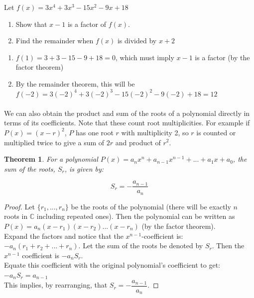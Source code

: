 \documentclass[12pt, a4paper, titlepage, twoside]{article}
\newcommand*{\C}{\mathbb{C}}
\newtheorem*{theorem*}{Theorem}
\newcounter{excount}[subsection]
\begin{document}
	\hfill
	
	\begin{ex}
		Let $f(x) = 3x^4 + 3x^3 - 15x^2 - 9x + 18$
		
		\begin{enumerate}[label=\textbf{(\alph*)}]
			\item Show that $x-1$ is a factor of $f(x)$.
			\item Find the remainder when $f(x)$ is divided by $x+2$
		\end{enumerate}
		
		\hfill
		\tcbline
		\hfill
		
		\begin{enumerate}[label=\textbf{(\alph*)}]
			\item $f(1) = 3 + 3 - 15 - 9 + 18 = 0$, which must imply $x-1$ is a factor (by the factor theorem)
			\item By the remainder theorem, this will be\\ $f(-2) = 3(-2)^4 + 3(-2)^3 - 15(-2)^2 -9(-2) + 18 = 12$
		\end{enumerate}
	\end{ex}
	
	\paragraph{}
	We can also obtain the product and sum of the roots of a polynomial directly in terms of its coefficients. Note that these
	count root multiplicities. For example if $P(x) = (x-r)^2$, $P$ has one root $r$ with multiplicity 2, so $r$ is counted or multiplied
	twice to give a sum of $2r$ and product of $r^2$.\\
	
	\begin{pf}
		\begin{theorem*}
			For a polynomial $P(x) = a_n x^n + a_{n-1} x^{n-1} + ... + a_1 x + a_0$, the sum of the roots, $S_r$, is
			given by:
			
			$$S_r = -\dfrac{a_{n-1}}{a_n}$$
		\end{theorem*}
		
		\tcbline		
		
		\begin{proof}
			Let $\{r_1, ..., r_n\}$ be the roots of the polynomial (there will be exactly $n$ roots in $\C$ including repeated ones). Then the polynomial
			can be written as $P(x) = a_n(x-r_1)(x-r_2)...(x-r_n)$ (by the factor theorem).\\
			
			Expand the factors and notice that the $x^{n-1}$-coefficient is: $-a_n(r_1 + r_2 + ... + r_n)$. Let the sum of the roots
			be denoted by $S_r$. Then the $x^{n-1}$ coefficient is $-a_n S_r$.\\
			
			Equate this coefficient with the original polynomial's coefficient to get: $-a_n S_r = a_{n-1}$\\
			
			This implies, by rearranging, that $S_r = -\dfrac{a_{n-1}}{a_n}$.	
		\end{proof}
	\end{pf}
	
\end{document}
